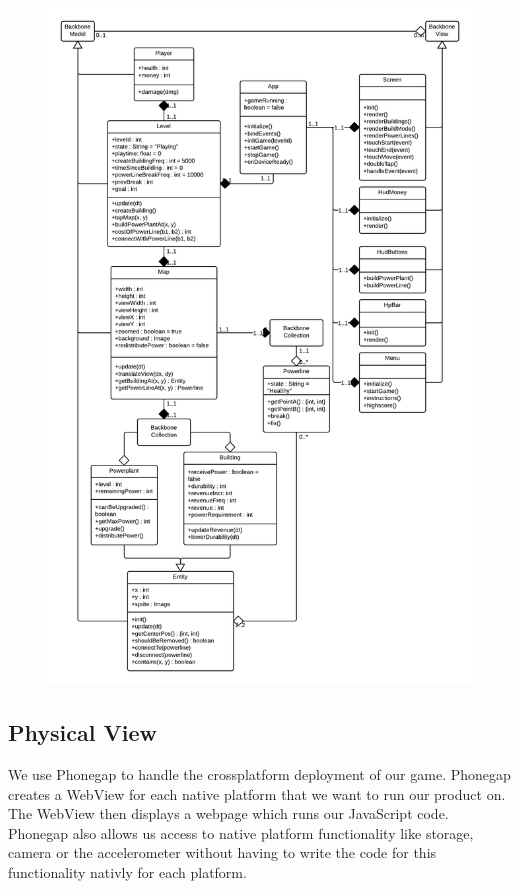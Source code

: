 	\begin{figure}[H]
	\centering
	\includegraphics[width=\textwidth, height=\textheight, keepaspectratio]{pictures/class_diagram}
	\end{figure}

\subsection*{Physical View}

We use Phonegap to handle the crossplatform deployment of our game. Phonegap creates a WebView for
each native platform that we want to run our product on. The WebView then displays a webpage which
runs our JavaScript code. Phonegap also allows us access to native platform functionality like
storage, camera or the accelerometer without having to write the code for this functionality nativly
for each platform.

